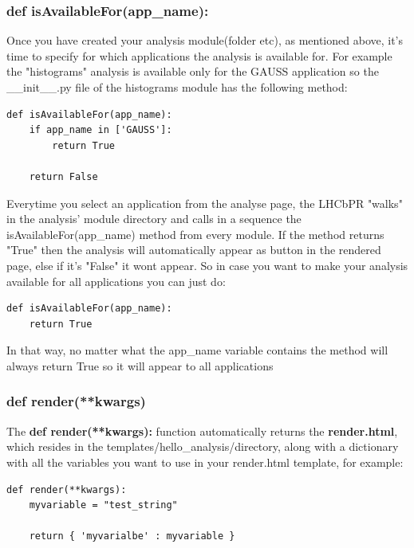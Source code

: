 \documentclass{lhcbnote}
\begin{document}
\subsubsection{def isAvailableFor(app\_name):}

Once you have created your analysis module(folder etc), as mentioned above, it's time to specify for which applications the analysis is available for.
For example the "histograms" analysis is available only for the GAUSS application so the \_\_init\_\_.py file of the histograms module has the following method:

\begin{verbatim}
def isAvailableFor(app_name):
    if app_name in ['GAUSS']:
        return True
    
    return False
\end{verbatim}

Everytime you select an application from the analyse page, the LHCbPR "walks" in the analysis' module directory and calls in a sequence 
the isAvailableFor(app\_name) method from every  module. If the method returns "True" then the analysis will automatically appear as 
button in the rendered page, else if it's "False"  it wont appear. So in case you want to make your analysis available for all applications you can just do:

\begin{verbatim}
def isAvailableFor(app_name):
    return True
\end{verbatim}

In that way, no matter what the app\_name variable contains the method will always return True so it will appear to all applications

\subsubsection{def render(**kwargs)}

The {\bf def render(**kwargs): } function automatically returns the {\bf render.html}, which resides in the templates/hello\_analysis/directory,
along with a dictionary with all the variables you want to use in your render.html template, 
for example:

\vspace{2 mm}

\begin{verbatim}
def render(**kwargs):
    myvariable = "test_string"

    return { 'myvarialbe' : myvariable }
\end{verbatim}
\end{document}
